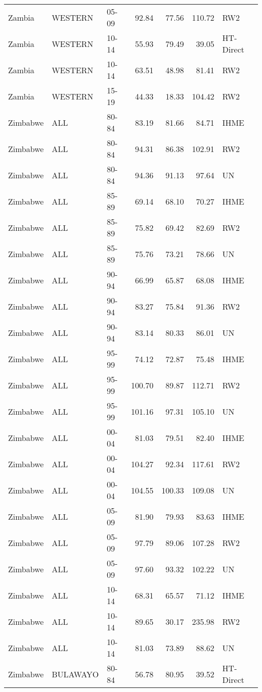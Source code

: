 \begin{longtable}{lllrrrl}
  Zambia & WESTERN & 05-09 & 92.84 & 77.56 & 110.72 & RW2 \\ 
  Zambia & WESTERN & 10-14 & 55.93 & 79.49 & 39.05 & HT-Direct \\ 
  Zambia & WESTERN & 10-14 & 63.51 & 48.98 & 81.41 & RW2 \\ 
  Zambia & WESTERN & 15-19 & 44.33 & 18.33 & 104.42 & RW2 \\ 
  Zimbabwe & ALL & 80-84 & 83.19 & 81.66 & 84.71 & IHME \\ 
  Zimbabwe & ALL & 80-84 & 94.31 & 86.38 & 102.91 & RW2 \\ 
  Zimbabwe & ALL & 80-84 & 94.36 & 91.13 & 97.64 & UN \\ 
  Zimbabwe & ALL & 85-89 & 69.14 & 68.10 & 70.27 & IHME \\ 
  Zimbabwe & ALL & 85-89 & 75.82 & 69.42 & 82.69 & RW2 \\ 
  Zimbabwe & ALL & 85-89 & 75.76 & 73.21 & 78.66 & UN \\ 
  Zimbabwe & ALL & 90-94 & 66.99 & 65.87 & 68.08 & IHME \\ 
  Zimbabwe & ALL & 90-94 & 83.27 & 75.84 & 91.36 & RW2 \\ 
  Zimbabwe & ALL & 90-94 & 83.14 & 80.33 & 86.01 & UN \\ 
  Zimbabwe & ALL & 95-99 & 74.12 & 72.87 & 75.48 & IHME \\ 
  Zimbabwe & ALL & 95-99 & 100.70 & 89.87 & 112.71 & RW2 \\ 
  Zimbabwe & ALL & 95-99 & 101.16 & 97.31 & 105.10 & UN \\ 
  Zimbabwe & ALL & 00-04 & 81.03 & 79.51 & 82.40 & IHME \\ 
  Zimbabwe & ALL & 00-04 & 104.27 & 92.34 & 117.61 & RW2 \\ 
  Zimbabwe & ALL & 00-04 & 104.55 & 100.33 & 109.08 & UN \\ 
  Zimbabwe & ALL & 05-09 & 81.90 & 79.93 & 83.63 & IHME \\ 
  Zimbabwe & ALL & 05-09 & 97.79 & 89.06 & 107.28 & RW2 \\ 
  Zimbabwe & ALL & 05-09 & 97.60 & 93.32 & 102.22 & UN \\ 
  Zimbabwe & ALL & 10-14 & 68.31 & 65.57 & 71.12 & IHME \\ 
  Zimbabwe & ALL & 10-14 & 89.65 & 30.17 & 235.98 & RW2 \\ 
  Zimbabwe & ALL & 10-14 & 81.03 & 73.89 & 88.62 & UN \\ 
  Zimbabwe & BULAWAYO & 80-84 & 56.78 & 80.95 & 39.52 & HT-Direct \\ 

\end{longtable}
